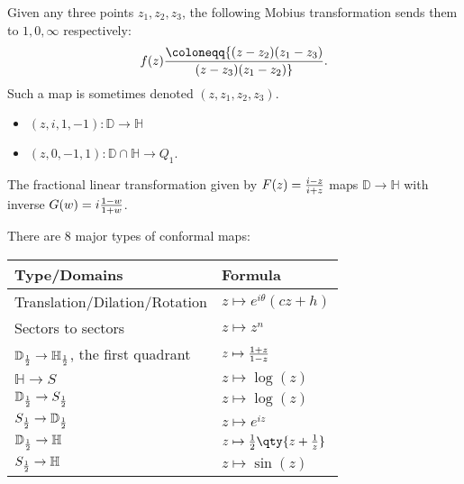 \begin{proposition}[?]

Given any three points \(z_1, z_2, z_3\), the following Mobius
transformation sends them to \(1, 0, \infty\) respectively:
\begin{align*}
f(z) \coloneqq{ (z-z_2) (z_1-z_3) \over (z-z_3) (z_1 - z_2)}
.\end{align*}
Such a map is sometimes denoted \((z, z_1, z_2, z_3)\).

\end{proposition}

\begin{example}[?]

\envlist

\begin{itemize}
\tightlist
\item
  \((z, i, 1, -1): {\mathbb{D}}\to {\mathbb{H}}\)
\item
  \((z, 0, -1, 1): {\mathbb{D}}\cap{\mathbb{H}}\to Q_1\).
\end{itemize}

\end{example}

\begin{theorem}

The fractional linear transformation given by
\(F(z) = {i - z \over i + z}\) maps \({\mathbb{D}}\to {\mathbb{H}}\)
with inverse \(G(w) = i {1-w \over 1 + w}\).

\end{theorem}

\begin{theorem}

There are 8 major types of conformal maps:

\begin{longtable}[]{@{}
  >{\raggedright\arraybackslash}p{}
  >{\raggedright\arraybackslash}p{}@{}}
\toprule
Type/Domains & Formula \\
\midrule
\endhead
Translation/Dilation/Rotation & \(z\mapsto e^{i\theta}(cz + h)\) \\
Sectors to sectors & \(z\mapsto z^n\) \\
\({\mathbb{D}}_{1\over 2} \to {\mathbb{H}}_{1\over 2}\), the first
quadrant & \(z\mapsto {1+z \over 1-z}\) \\
\({\mathbb{H}}\to S\) & \(z\mapsto \log(z)\) \\
\({\mathbb{D}}_{1\over 2} \to S_{1\over 2}\) & \(z\mapsto \log(z)\) \\
\(S_{1\over 2} \to {\mathbb{D}}_{1\over 2}\) & \(z\mapsto e^{iz}\) \\
\({\mathbb{D}}_{1\over 2} \to {\mathbb{H}}\) &
\(z\mapsto {1\over 2}\qty{z + {1\over z}}\) \\
\(S_{1\over 2} \to {\mathbb{H}}\) & \(z\mapsto \sin(z)\) \\
\bottomrule
\end{longtable}

\end{theorem}

